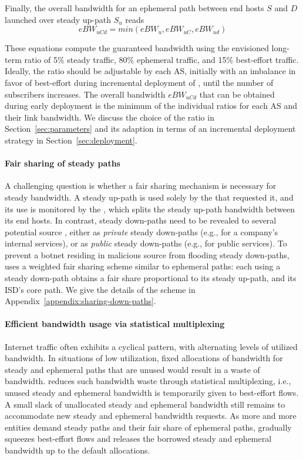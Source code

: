 Finally, the overall bandwidth for an ephemeral path
between end hosts $S$ and $D$ launched over
steady up-path $S_u$ reads
\begin{equation}
  eBW_{uCd} = min(eBW_u, eBW_{uC}, eBW_{ud})
\end{equation}


These equations compute the guaranteed bandwidth using the envisioned long-term
ratio of 5\% steady traffic, 80\% ephemeral traffic, and 15\% best-effort
traffic. Ideally, the ratio should be adjustable by each AS, initially with an
imbalance in favor of best-effort during incremental deployment of \name, until the
number of \name subscribers increases. The overall bandwidth $eBW_{uCd}$ that
can be obtained during early deployment is the minimum of the individual ratios
for each AS and their link bandwidth. We discuss the choice of the ratio in
Section~\ref{sec:parameters} and its adaption in terms of an incremental
deployment strategy in Section~\ref{sec:deployment}.

\paragraph{Fair sharing of steady paths} A challenging question is whether a
fair sharing mechanism is necessary for steady bandwidth. A steady up-path is
used solely by the \AD that requested it, and its use is monitored by the \AD,
which splits the steady up-path bandwidth between its end hosts. In contrast,
steady down-paths need to be revealed to several potential source \ADs, either
as \emph{private} steady down-paths (e.g., for a company's internal services),
or as \emph{public} steady down-paths (e.g., for public services). To
prevent a botnet residing in malicious source \ADs from flooding steady
down-paths, \name uses a weighted fair sharing scheme similar to ephemeral
paths: each \AD using a steady down-path obtains a fair share proportional to
its steady up-path, and its ISD's core path. We give the details of the scheme
in Appendix~\ref{appendix:sharing-down-paths}.

\paragraph{Efficient bandwidth usage via statistical multiplexing}
Internet traffic often exhibits a cyclical pattern, with alternating levels of
utilized bandwidth.
In situations of low utilization, fixed
allocations of bandwidth for steady and ephemeral paths that are
unused would result in a waste of bandwidth. \name reduces such
bandwidth waste through statistical multiplexing,
i.e., unused steady and ephemeral bandwidth is temporarily given to
best-effort flows. A small slack of unallocated steady and ephemeral
bandwidth still remains to accommodate new steady and ephemeral
bandwidth requests. As more and more entities demand steady paths and
their fair share of ephemeral paths, \name gradually squeezes
best-effort flows and releases the borrowed steady and ephemeral
bandwidth up to the default allocations.


